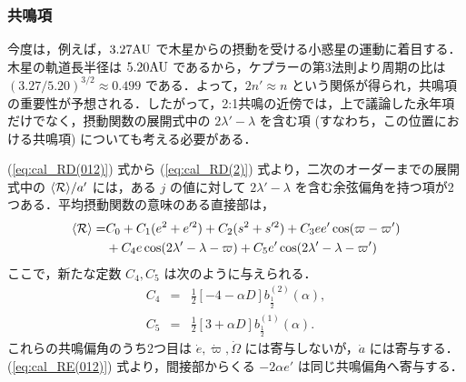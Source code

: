 \documentclass[11pt,a4paper,oneside,onecolumn]{jreport}
\begin{document}
\subsubsection{共鳴項}
今度は，例えば，$3.27{\rm AU}$ で木星からの摂動を受ける小惑星の運動に着目する．木星の軌道長半径は $5.20 {\rm AU}$ であるから，ケプラーの第3法則より周期の比は $(3.27/5.20)^{3/2} \approx 0.499$ である．よって，$2 n' \approx n$ という関係が得られ，共鳴項の重要性が予想される．したがって，2:1共鳴の近傍では，上で議論した永年項だけでなく，摂動関数の展開式中の $2 \lambda' - \lambda$ を含む項 (すなわち，この位置における共鳴項) についても考える必要がある．

(\ref{eq:cal_RD(012)}) 式から (\ref{eq:cal_RD(2)}) 式より，二次のオーダーまでの展開式中の $\langle {\cal R} \rangle / a'$ には，ある $j$ の値に対して $2\lambda' - \lambda$ を含む余弦偏角を持つ項が2つある．平均摂動関数の意味のある直接部は，
\begin{equation}
\begin{split}
\langle {\cal R} \rangle = & C_0 + C_1 (e^2 + e'^2) + C_2 (s^2 + s'^2) + C_3 e e' \cos (\varpi - \varpi') \\
& + C_4 e \cos (2 \lambda' - \lambda - \varpi) + C_5 e' \cos (2 \lambda' - \lambda - \varpi')
\end{split}
\end{equation} 
ここで，新たな定数 $C_4, C_5$ は次のように与えられる．
\begin{eqnarray}
C_4 & = & \frac{1}{2} [- 4 - \alpha D] b_{\frac{1}{2}}^{(2)} (\alpha), \\
C_5 & = & \frac{1}{2} [3 + \alpha D] b_{\frac{1}{2}}^{(1)} (\alpha).
\end{eqnarray}
これらの共鳴偏角のうち2つ目は $\dot{e}, \dot{\varpi}, \dot{\Omega}$ には寄与しないが，$\dot{a}$ には寄与する．(\ref{eq:cal_RE(012)}) 式より，間接部からくる $- 2 \alpha e'$ は同じ共鳴偏角へ寄与する．
\end{document}
